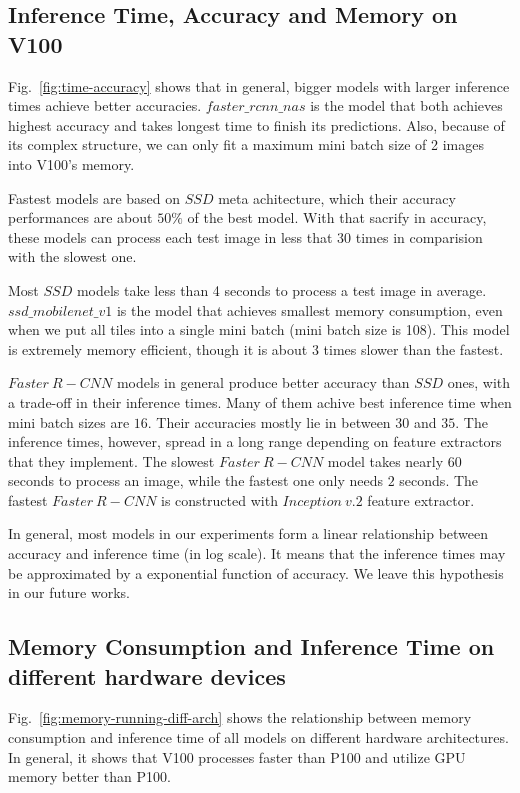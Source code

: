 \documentclass[conference]{IEEEtran}
\begin{document}
\subsection{Inference Time, Accuracy and Memory on V100}
Fig.~\ref{fig:time-accuracy} shows that in general, bigger models with larger inference times achieve better accuracies. $faster\_rcnn\_nas$ is the model that both achieves highest accuracy and takes longest time to finish its predictions. Also, because of its complex structure, we can only fit a maximum mini batch size of 2 images into V100's memory.

Fastest models are based on $SSD$ meta achitecture, which their accuracy performances are about $50\%$ of the best model. With that sacrify in accuracy, these models can process each test image in less that 30 times in comparision with the slowest one.

Most $SSD$ models take less than 4 seconds to process a test image in average. $ssd\_mobilenet\_v1$ is the model that achieves smallest memory consumption, even when we put all tiles into a single mini batch (mini batch size is 108). This model is extremely memory efficient, though it is about 3 times slower than the fastest.

$Faster\ R-CNN$ models in general produce better accuracy than $SSD$ ones, with a trade-off in their inference times. Many of them achive best inference time when mini batch sizes are $16$. Their accuracies mostly lie in between $30$ and $35$. The inference times, however, spread in a long range depending on feature extractors that they implement. The slowest $Faster\ R-CNN$ model takes nearly 60 seconds to process an image, while the fastest one only needs $2$ seconds. The fastest $Faster\ R-CNN$ is constructed with $Inception\ v.2$ feature extractor.

In general, most models in our experiments form a linear relationship between accuracy and inference time (in log scale). It means that the inference times may be approximated by a exponential function of accuracy. We leave this hypothesis in our future works.

\subsection{Memory Consumption and Inference Time on different hardware devices}
Fig.~\ref{fig:memory-running-diff-arch} shows the relationship between memory consumption and inference time of all models on different hardware architectures. In general, it shows that V100 processes faster than P100 and utilize GPU memory better than P100.
\end{document}
